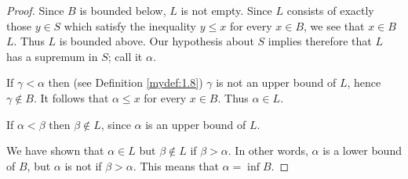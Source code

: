 \begin{proof}
    Since $B$ is bounded below, $L$ is not empty. 
    Since $L$ consists of exactly those $y \in S$ 
    which satisfy the inequality $y \leq x$ for every $x \in B$, 
    we see that  $x \in B$  $L$. 
    Thus $L$ is bounded above.
    Our hypothesis about $S$ implies therefore that 
    $L$ has a supremum in $S$; 
    call it $\alpha$.

    If $\gamma < \alpha$ then (see Definition \ref{mydef:1.8}) 
    $\gamma$ is not an upper bound of $L$, 
    hence $\gamma \not\in B$. 
    It follows that $\alpha \leq x$ for every $x \in B$. 
    Thus $\alpha \in L$.

    If $\alpha < \beta$ then $\beta \not\in L$, 
    since $\alpha$ is an upper bound of $L$.

    We have shown that $\alpha \in L$ 
    but $\beta \not\in  L$ if $\beta > \alpha$. 
    In other words, $\alpha$ is a lower bound of $B$, 
    but $\alpha$ is not if $\beta > \alpha$. 
    This means that $\alpha = \inf B$.
\end{proof}


